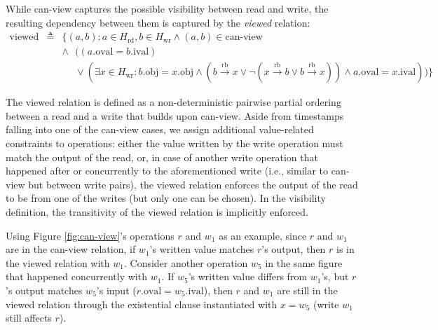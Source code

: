  While can-view captures the possible visibility between read and write, the
  resulting dependency between them is captured by the \textit{viewed} relation:
  \begin{eqnarray*}
    \text{viewed} & \triangleq & \{(a, b) : a \in H_\text{rd}, b \in
      H_\text{wr}  \land (a, b) \in \text{can-view} \quad \\
	  & & \land \text{ } ( (a.\text{oval} = b.\text{ival}) \quad \\
	  & & \text{ } \text{ } \lor (\exists x \in H_\text{wr} : 
		b.\text{obj} = x.\text{obj}  \land
		(b\xrightarrow{\text{rb}}x \lor \lnot(x \xrightarrow{\text{rb}} b \lor b \xrightarrow{\text{rb}} x)) \land a.\text{oval} = x.\text{ival})
      )
    \}
  \end{eqnarray*}


  The viewed relation is defined as a non-deterministic
  pairwise partial ordering
  between a read and a write that builds upon can-view. Aside from timestamps
  falling into one of the can-view cases, we
  assign additional value-related constraints to operations: either the value
  written by the write operation must match the output
  of the read, or, in case of another write operation that happened after or
  concurrently to the aforementioned write (i.e., similar to can-view but between
  write pairs), the viewed relation enforces the
  output of the read to be from one of the writes (but only one can be chosen).
  In the visibility definition, the transitivity of the viewed relation
  is implicitly
  enforced.

  Using Figure \ref{fig:can-view}'s operations $r$ and $w_1$ as an example,
  since $r$ and $w_1$ are in the can-view relation, if $w_1$'s written
  value matches $r$'s output, then $r$ is in the viewed relation with $w_1$.
  Consider another operation $w_5$ in the same figure that happened
  concurrently with $w_1$. If $w_5$'s written value differs
  from $w_1$'s, but $r$'s output matches $w_5$'s input ($r.\text{oval} =
  w_5.\text{ival}$), then $r$ and $w_1$ are still in the viewed relation through
  the existential clause instantiated with $x = w_5$ (write $w_1$ still affects
  $r$). 


